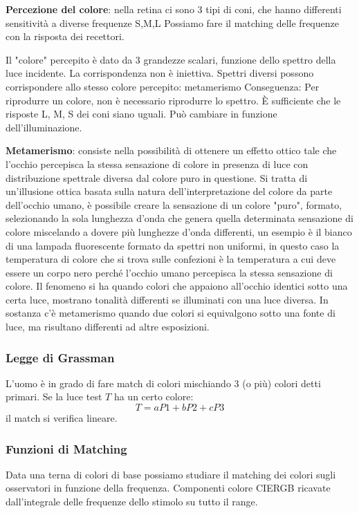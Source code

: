 \documentclass[a4paper, 10pt]{article}
\begin{document}
			\noindent
			\textbf{Percezione del colore}: nella retina ci sono 3 tipi di coni, che
			hanno differenti sensitività a diverse frequenze S,M,L
			Possiamo fare il matching delle frequenze con la risposta dei
			recettori.
			
			\bigskip
			
			Il "colore" percepito è dato da 3 grandezze scalari, funzione
			dello spettro della luce incidente.
			La corrispondenza non è iniettiva. Spettri diversi possono
			corrispondere allo stesso colore percepito: metamerismo
			Conseguenza: Per riprodurre un colore, non è necessario
			riprodurre lo spettro. È sufficiente che le risposte L, M, S dei
			coni siano uguali.
			Può cambiare in funzione dell'illuminazione.
			
			\noindent
			\textbf{Metamerismo}: consiste nella possibilità di ottenere un effetto ottico tale che l'occhio percepisca la stessa sensazione di colore in presenza di luce con distribuzione spettrale diversa dal colore puro in questione.
			Si tratta di un'illusione ottica basata sulla natura dell'interpretazione del colore da parte dell'occhio umano, è possibile creare la sensazione di un colore "puro", formato, selezionando la sola lunghezza d'onda che genera quella determinata sensazione di colore miscelando a dovere più lunghezze d'onda differenti, un esempio è il bianco di una lampada fluorescente formato da spettri non uniformi, in questo caso la temperatura di colore che si trova sulle confezioni è la temperatura a cui deve essere un corpo nero perché l'occhio umano percepisca la stessa sensazione di colore.
			Il fenomeno si ha quando colori che appaiono all'occhio identici sotto una certa luce, mostrano tonalità differenti se illuminati con una luce diversa. In sostanza c'è metamerismo quando due colori si equivalgono sotto una fonte di luce, ma risultano differenti ad altre esposizioni.
			
		\subsubsection{Legge di Grassman}
			L'uomo è in grado di fare match di colori mischiando 3 (o
			più) colori detti primari. Se la luce test $ T $ ha un certo colore:
			\[
				T = aP1 + bP2 + cP3
			\]
			il match si verifica lineare.
			
		\subsubsection{Funzioni di Matching}
			Data una terna di colori di base possiamo studiare il matching
			dei colori sugli osservatori in funzione della frequenza.
			Componenti colore CIERGB ricavate dall'integrale delle
			frequenze dello stimolo su tutto il range.
			
\end{document}
